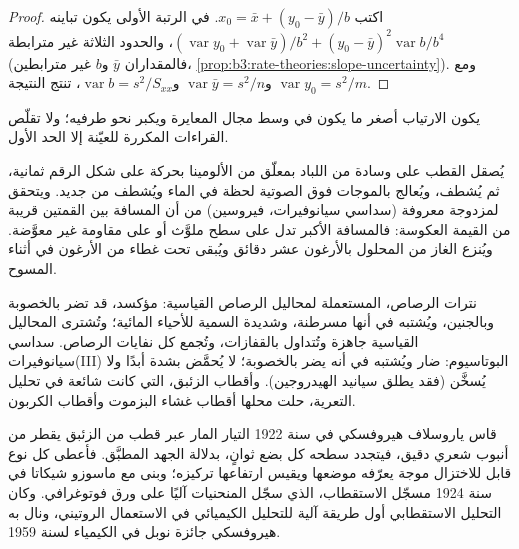 \begin{proof}
اكتب $x_0 = \bar x + (y_0 - \bar y)/b$. في الرتبة الأولى يكون تباينه $(\operatorname{var}y_0 +
\operatorname{var}\bar y)/b^2 + (y_0 - \bar y)^2\operatorname{var}b/b^4$، والحدود الثلاثة غير مترابطة (فالمقداران $\bar y$ و$b$
غير مترابطين، \cref{prop:b3:rate-theories:slope-uncertainty}). ومع $\operatorname{var}y_0 =
s^2/m$ و$\operatorname{var}\bar y = s^2/n$ و$\operatorname{var}b = s^2/S_{xx}$، تنتج النتيجة.
\end{proof}

يكون الارتياب أصغر ما يكون في وسط مجال المعايرة ويكبر
نحو طرفيه؛ ولا تقلّص القراءات المكررة للعيّنة إلا الحد الأول.

\begin{inthelab}
يُصقل القطب على وسادة من اللباد بمعلّق من الألومينا بحركة
على شكل الرقم ثمانية، ثم يُشطف، ويُعالج بالموجات فوق الصوتية لحظة في الماء ويُشطف من جديد. 
ويتحقق  لمزدوجة معروفة (سداسي سيانوفيرات، فيروسين) من أن
المسافة بين القمتين قريبة من القيمة العكوسة: فالمسافة الأكبر تدل على
سطح ملوَّث أو على مقاومة غير معوَّضة. ويُنزع الغاز من المحلول بالأرغون
عشر دقائق ويُبقى تحت غطاء من الأرغون في أثناء المسوح.
\end{inthelab}

\begin{safety}{}
نترات الرصاص، المستعملة لمحاليل الرصاص القياسية: مؤكسد، قد تضر بالخصوبة 
وبالجنين، ويُشتبه في أنها مسرطنة، وشديدة السمية للأحياء المائية؛ وتُشترى المحاليل
القياسية جاهزة وتُتداول بالقفازات، وتُجمع كل نفايات الرصاص.
سداسي سيانوفيرات(III) البوتاسيوم: ضار ويُشتبه في أنه يضر
بالخصوبة؛ لا يُحمَّض بشدة أبدًا ولا يُسخَّن (فقد يطلق سيانيد
الهيدروجين). وأقطاب الزئبق، التي كانت شائعة في تحليل التعرية،
حلت محلها أقطاب غشاء البزموت وأقطاب الكربون.
\end{safety}

\begin{history}
قاس ياروسلاف هيروفسكي في سنة 1922 التيار المار عبر قطب من الزئبق
يقطر من أنبوب شعري دقيق، فيتجدد سطحه كل بضع ثوانٍ،
بدلالة الجهد المطبَّق. فأعطى كل نوع قابل للاختزال موجة يعرّفه
موضعها ويقيس ارتفاعها تركيزه؛ وبنى مع
ماسوزو شيكاتا في سنة 1924 مسجّل الاستقطاب، الذي سجّل المنحنيات
آليًا على ورق فوتوغرافي. وكان التحليل الاستقطابي أول طريقة آلية
للتحليل الكيميائي في الاستعمال الروتيني، ونال به هيروفسكي جائزة نوبل
في الكيمياء لسنة 1959.
\end{history}

